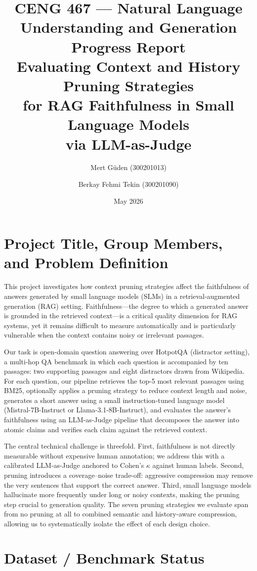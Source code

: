 \documentclass[11pt,a4paper]{article}
\title{
    \textbf{CENG 467 --- Natural Language Understanding and Generation} \\[0.5em]
    \large Progress Report \\[0.5em]
    \LARGE Evaluating Context and History Pruning Strategies \\
    for RAG Faithfulness in Small Language Models \\
    via LLM-as-Judge
}
\author{
    Mert G\"{u}den (300201013) \and Berkay Fehmi Tekin (300201090)
}
\date{May 2026}
\begin{document}
\maketitle

\section{Project Title, Group Members, and Problem Definition}

This project investigates how context pruning strategies affect the faithfulness of answers generated by small language models (SLMs) in a retrieval-augmented generation (RAG) setting. Faithfulness---the degree to which a generated answer is grounded in the retrieved context---is a critical quality dimension for RAG systems, yet it remains difficult to measure automatically and is particularly vulnerable when the context contains noisy or irrelevant passages.

Our task is open-domain question answering over HotpotQA \cite{yang2018hotpotqa} (distractor setting), a multi-hop QA benchmark in which each question is accompanied by ten passages: two supporting passages and eight distractors drawn from Wikipedia. For each question, our pipeline retrieves the top-5 most relevant passages using BM25, optionally applies a pruning strategy to reduce context length and noise, generates a short answer using a small instruction-tuned language model (Mistral-7B-Instruct or Llama-3.1-8B-Instruct), and evaluates the answer's faithfulness using an LLM-as-Judge pipeline that decomposes the answer into atomic claims and verifies each claim against the retrieved context.

The central technical challenge is threefold. First, faithfulness is not directly measurable without expensive human annotation; we address this with a calibrated LLM-as-Judge \cite{es2023ragas} anchored to Cohen's $\kappa$ against human labels. Second, pruning introduces a coverage--noise trade-off: aggressive compression may remove the very sentences that support the correct answer. Third, small language models hallucinate more frequently under long or noisy contexts, making the pruning step crucial to generation quality. The seven pruning strategies we evaluate span from no pruning at all to combined semantic and history-aware compression, allowing us to systematically isolate the effect of each design choice.

\section{Dataset / Benchmark Status}
\end{document}
